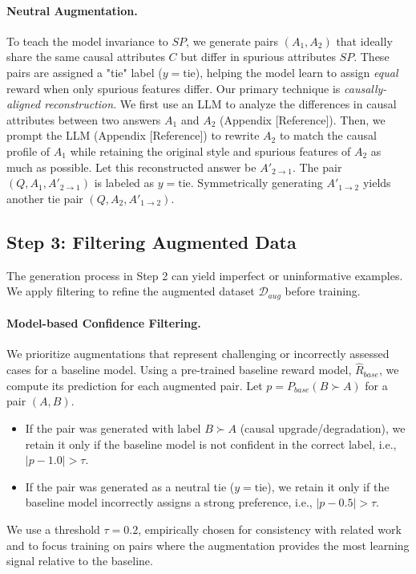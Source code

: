 \paragraph{Neutral Augmentation.} To teach the model invariance to $SP$, we generate pairs $(A_1, A_2)$ that ideally share the same causal attributes $C$ but differ in spurious attributes $SP$. These pairs are assigned a "tie" label ($y = \text{tie}$), helping the model learn to assign \emph{equal} reward when only spurious features differ. Our primary technique is \emph{causally-aligned reconstruction}. We first use an LLM to analyze the differences in causal attributes between two answers $A_1$ and $A_2$ (Appendix [Reference]). Then, we prompt the LLM (Appendix [Reference]) to rewrite $A_2$ to match the causal profile of $A_1$ while retaining the original style and spurious features of $A_2$ as much as possible. Let this reconstructed answer be $A'_{2 \to 1}$. The pair $(Q, A_1, A'_{2 \to 1})$ is labeled as $y = \text{tie}$. Symmetrically generating $A'_{1 \to 2}$ yields another tie pair $(Q, A_2, A'_{1 \to 2})$.

\subsection{Step 3: Filtering Augmented Data}
\label{subsec:filtering_revised}

The generation process in Step 2 can yield imperfect or uninformative examples. We apply filtering to refine the augmented dataset $\mathcal{D}_{aug}$ before training.

\paragraph{Model-based Confidence Filtering.} We prioritize augmentations that represent challenging or incorrectly assessed cases for a baseline model. Using a pre-trained baseline reward model, $\hat{R}_{base}$, we compute its prediction for each augmented pair. Let $p = P_{base}(B \succ A)$ for a pair $(A, B)$.
\begin{itemize}[itemsep=0pt,left=2pt]
    \item If the pair was generated with label $B \succ A$ (causal upgrade/degradation), we retain it only if the baseline model is not confident in the correct label, i.e., $|p - 1.0| > \tau$.
    \item If the pair was generated as a neutral tie ($y=\text{tie}$), we retain it only if the baseline model incorrectly assigns a strong preference, i.e., $|p - 0.5| > \tau$.
\end{itemize}
We use a threshold $\tau=0.2$, empirically chosen for consistency with related work \cite{liu2024rrm} and to focus training on pairs where the augmentation provides the most learning signal relative to the baseline.

